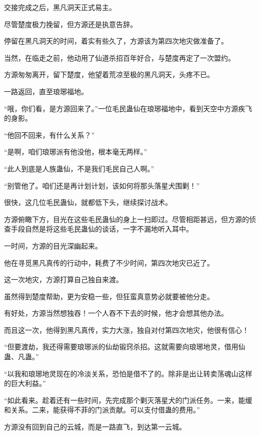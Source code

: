
\begin{this_body}



交接完成之后，黑凡洞天正式易主。

尽管楚度极力挽留，但方源还是执意告辞。

停留在黑凡洞天的时间，着实有些久了，方源该为第四次地灾做准备了。

当然，在临走之前，他动用了仙道杀招百年好合，与楚度再定了一次盟约。

方源匆匆离开，留下楚度，他望着荒凉至极的黑凡洞天，头疼不已。

一路返回，直至琅琊福地。

“哦，你们看，是方源回来了。”一位毛民蛊仙在琅琊福地中，看到天空中方源疾飞的身影。

“他回不回来，有什么关系？”

“是啊，咱们琅琊派有他没他，根本毫无两样。”

“此人到底是人族蛊仙，不是我们毛民自己人啊。”

“别管他了。咱们还是再计划计划，该如何将那头落星犬围剿！”

很快，这几位毛民蛊仙，就都低下头，继续探讨战术。

方源俯瞰下方，目光在这些毛民蛊仙的身上一扫即过。尽管相距甚远，但方源的侦查手段自然是将这些毛民蛊仙的谈话，一字不漏地听入耳中。

一时间，方源的目光深幽起来。

他在寻觅黑凡真传的行动中，耗费了不少时间，第四次地灾已近了。

这一次地灾，方源打算自己独自来渡。

虽然得到楚度帮助，更为安稳一些，但狂蛮真意势必就要被他分走。

有好处，方源当然想独吞！一个人吞不下去的时候，他才会想其他办法。

而且这一次，他得到黑凡真传，实力大涨，独自对付第四次地灾，他很有信心！

“但要渡劫，我还得需要琅琊派的仙劫锻窍杀招。这就需要向琅琊地灵，借用仙蛊、凡蛊。”

“以我和琅琊地灵现在的冷淡关系，恐怕是借不了的。除非是出让转卖荡魂山这样的巨大利益。”

“如此看来。趁着还有一些时间，先完成那个剿灭落星犬的门派任务。一来，能缓和关系。二来，能获得不菲的门派贡献。可以支付借蛊的费用。”

方源没有回到自己的云城，而是一路直飞，到达第一云城。


\end{this_body}
